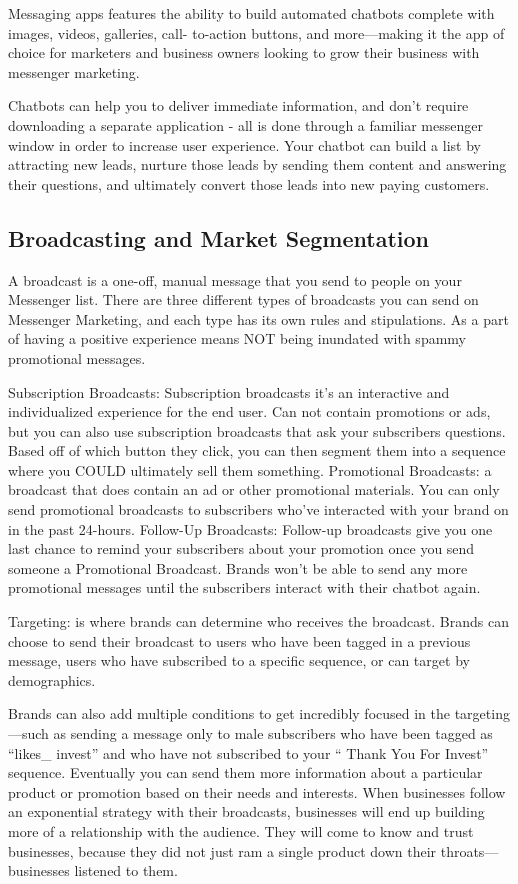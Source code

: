\documentclass[	DIV=calc,%
							paper=letter,%
							fontsize=12pt%
                            ]{scrartcl}	 					%
\begin{document}
Messaging apps features the ability to build automated chatbots complete with images, videos, galleries,
call- to-action buttons, and more—making it the app of choice for marketers and business owners looking to grow their business with messenger marketing.

Chatbots can help you to deliver immediate information, and don’t require downloading a separate application - all is done through a familiar messenger window in order to increase user experience. Your chatbot can build a list by attracting new leads, nurture those leads by sending them content and answering their questions, and ultimately convert those leads into new paying customers.

\subsection{\label{sec:level2}Broadcasting and Market Segmentation}

A broadcast is a one-off, manual message that you send to people on your Messenger list. There are three different types of broadcasts you can send on Messenger Marketing, and each type has its own rules and stipulations. As a part of having a positive experience means NOT being inundated with spammy promotional messages.

Subscription Broadcasts: Subscription broadcasts it’s an interactive and individualized experience for the end user. Can not contain promotions or ads, but you can also use subscription broadcasts that ask your subscribers questions. Based off of which button they click, you can then segment them into a sequence where you COULD ultimately sell them something.
Promotional Broadcasts: a broadcast that does contain an ad or other promotional materials. You can only send promotional broadcasts to subscribers who’ve interacted with your brand on in the past 24-hours.
Follow-Up Broadcasts: Follow-up broadcasts give you one last chance to remind your subscribers about your promotion once you send someone a Promotional Broadcast. Brands won’t be able to send any more promotional messages until the subscribers interact with their chatbot again.


Targeting: is where brands can determine who receives the broadcast. Brands can choose to send their broadcast to users who have been tagged in a previous message, users who have subscribed to a specific sequence, or can target by demographics.

Brands can also add multiple conditions to get incredibly focused in the targeting —such as sending a message only to male subscribers who have been tagged as ``likes\_ invest'' and who have not subscribed to your `` Thank You For Invest'' sequence. Eventually you can send them more information about a particular product or promotion based on their needs and interests.
When businesses follow an exponential strategy with their broadcasts, businesses will end up building more of a relationship with the audience. They will come to know and trust businesses, because they did not just ram a single product down their throats— businesses listened to them.
\end{document}
